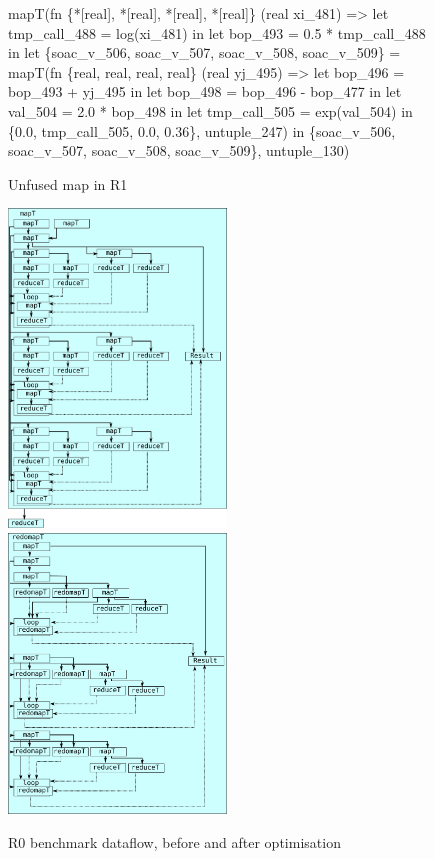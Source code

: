 \begin{figure}
\begin{center}
\begin{bcolorcode}
mapT(fn \{*[real], *[real], *[real], *[real]\} (real xi_481) =>
       let tmp_call_488 = log(xi_481) in
       let bop_493 = 0.5 * tmp_call_488 in
       let \{soac_v_506, soac_v_507, soac_v_508, soac_v_509\} =
         mapT(fn \{real, real, real, real\} (real yj_495) =>
                let bop_496 = bop_493 + yj_495 in
                let bop_498 = bop_496 - bop_477 in
                let val_504 = 2.0 * bop_498 in
                let tmp_call_505 = exp(val_504) in
                \{0.0, tmp_call_505, 0.0, 0.36\},
              untuple_247) in
       \{soac_v_506, soac_v_507, soac_v_508, soac_v_509\},
     untuple_130)
\end{bcolorcode}
\end{center}
\caption{Unfused map in R1}
\label{fig:r1-unfused-map}
\end{figure}

\begin{figure}
\begin{center}
\includegraphics[width=5.8cm,valign=t]{img/CalibLexiFi-unfused.pdf}
\hspace{0.2cm}
\includegraphics[width=5.8cm,valign=t]{img/CalibLexiFi-fused.pdf}
\end{center}
\caption{R0 benchmark dataflow, before and after optimisation}
\label{fig:r2-dataflow}
\end{figure}

